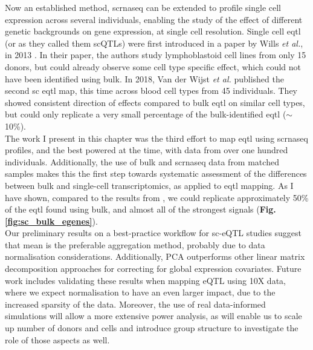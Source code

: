 Now an established method, \gls{scrnaseq} can be extended to profile single cell expression across several individuals, enabling the study of the effect of different genetic backgrounds on gene expression, at single cell resolution.
Single cell \gls{eqtl} (or as they called them scQTLs) were first introduced in a paper by Wills \textit{et al.}, in 2013 \cite{wills2013single}.
In their paper, the authors study lymphoblastoid cell lines from only 15 donors, but could already observe some cell type specific effect, which could not have been identified using bulk.
In 2018, Van der Wijst \textit{et al.} \cite{van2018single} published the second sc \gls{eqtl} map, this time across blood cell types from 45 individuals.
They showed consistent direction of effects compared to bulk \gls{eqtl} on similar cell types, but could only replicate a very small percentage of the bulk-identified \gls{eqtl} ($\sim$10\%). \\

The work I present in this chapter \cite{cuomo2020single} was the third effort to map \gls{eqtl} using \gls{scrnaseq} profiles, and the best powered at the time, with data from over one hundred individuals.
Additionally, the use of bulk and \gls{scrnaseq} data from matched samples makes this the first step towards systematic assessment of the differences between bulk and single-cell transcriptomics, as applied to \gls{eqtl} mapping.
As I have shown, compared to the results from \cite{van2018single}, we could replicate approximately 50\% of the \gls{eqtl} found using bulk, and almost all of the strongest signals (\textbf{Fig. \ref{fig:sc_bulk_egenes}}). \\

Our preliminary results on a best-practice workflow for sc-eQTL studies suggest that mean is the preferable aggregation method, probably due to data normalisation considerations.
Additionally, PCA outperforms other linear matrix decomposition approaches for correcting for global expression covariates.
Future work includes validating these results when mapping eQTL using 10X data, where we expect normalisation to have an even larger impact, due to the increased sparsity of the data.
Moreover, the use of real data-informed simulations will allow a more extensive power analysis, as will enable us to scale up number of donors and cells and introduce group structure to investigate the role of those aspects as well.
\\

